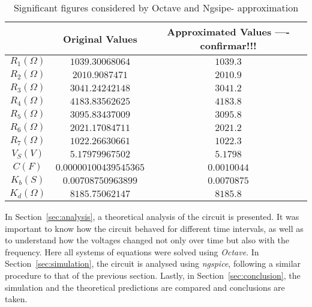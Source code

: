 \begin{table}[hbt!]
  \centering
  \begin{tabular}{|c|c|c|}
    \hline
    &           \textbf{Original Values}        & \textbf{Approximated Values ---- confirmar!!!}\\ \hline
    $R_1 (\Omega)$   &  $   1039.30068064   $     & $1039.3$\\ \hline
    $R_2 (\Omega)$   &  $   2010.9087471    $      & $2010.9$\\ \hline
    $R_3 (\Omega)$   &  $   3041.24242148   $    & $3041.2$\\ \hline
    $R_4 (\Omega)$   &  $   4183.83562625   $     & $4183.8$\\ \hline
    $R_5 (\Omega)$   &  $   3095.83437009   $     & $3095.8$\\ \hline
    $R_6 (\Omega)$   &  $   2021.17084711   $     & $2021.2$\\ \hline
    $R_7 (\Omega)$   &  $   1022.26630661   $     & $1022.3$\\\hline
    $V_S (V)$   &  $   5.17979967502   $     & $5.1798$\\ \hline
    $C (F)$   &  $    0.00000100439545365     $     & $0.0010044$\\ \hline
    $K_b (S)$   &  $    0.00708750963899     $     & $0.0070875$\\ \hline
    $K_d (\Omega)$   &     $8185.75062147    $     & $8185.8$\\ \hline
  \end{tabular}
  \caption{Significant figures considered by Octave and Ngsipe- approximation} 
  \label{tab:ap}
\end{table}


In Section~\ref{sec:analysis}, a theoretical analysis of the circuit is presented. It was important to know how the circuit behaved for different time intervals, as well as to understand how the voltages changed not only over time but also with the frequency. Here all systems of equations were solved using \textit{Octave}. In Section~\ref{sec:simulation}, the circuit is analysed using \textit{ngspice}, following a similar procedure to that of the previous section. Lastly, in Section~\ref{sec:conclusion}, the simulation and the theoretical predictions are compared and conclusions are taken.

